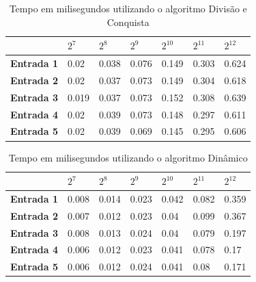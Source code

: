 \documentclass[
	12pt,				%
	oneside,   	        %
	a4paper,			%
	english,			%
	french,				%
	spanish,			%
	brazil,				%
	]{pacotes/abntex2}
\begin{document}
\begin{apendicesenv}
\begin{table}[!htb]
\centering
\caption{Tempo em milisegundos utilizando o algoritmo Divisão e Conquista}
\label{tab:java7}
\footnotesize   %
\begin{tabular}{l|llllll}
\toprule
& \textbf{$2^7$} & \textbf{$2^8$} & \textbf{$2^9$} & \textbf{$2^{10}$} & \textbf{$2^{11}$} & \textbf{$2^{12}$}\\ 
\midrule
\textbf{Entrada 1} & 0.02 &	0.038 &	0.076 &	0.149 &	0.303 &	0.624\\
\textbf{Entrada 2} & 0.02 &	0.037 &	0.073 &	0.149 &	0.304 &	0.618\\
\textbf{Entrada 3} & 0.019 & 0.037 &	0.073 &	0.152 &	0.308 &	0.639\\
\textbf{Entrada 4} & 0.02 & 0.039 &	0.073 &	0.148 &	0.297 &	0.611\\
\textbf{Entrada 5} & 0.02 & 0.039 &	0.069 &	0.145 &	0.295 &	0.606\\

 \bottomrule
\end{tabular}
\end{table}

\begin{table}[!htb]
\centering
\caption{Tempo em milisegundos utilizando o algoritmo Dinâmico}
\label{tab:java8}
\footnotesize   %
\begin{tabular}{l|llllll}
\toprule
& \textbf{$2^7$} & \textbf{$2^8$} & \textbf{$2^9$} & \textbf{$2^{10}$} & \textbf{$2^{11}$} & \textbf{$2^{12}$}\\ 
\midrule
\textbf{Entrada 1} & 0.008 &	0.014 &	0.023 &	0.042 &	0.082 &	0.359\\
\textbf{Entrada 2} & 0.007 &	0.012 &	0.023 &	0.04 &	0.099 &	0.367\\
\textbf{Entrada 3} & 0.008 &	0.013 &	0.024 &	0.04 &	0.079 &	0.197\\
\textbf{Entrada 4} & 0.006 &	0.012 &	0.023 &	0.041 &	0.078 &	0.17\\
\textbf{Entrada 5} & 0.006 &	0.012 &	0.024 &	0.041 &	0.08 &	0.171\\
 \bottomrule
\end{tabular}
\end{table}


\end{apendicesenv}
\newpage
\end{document}
